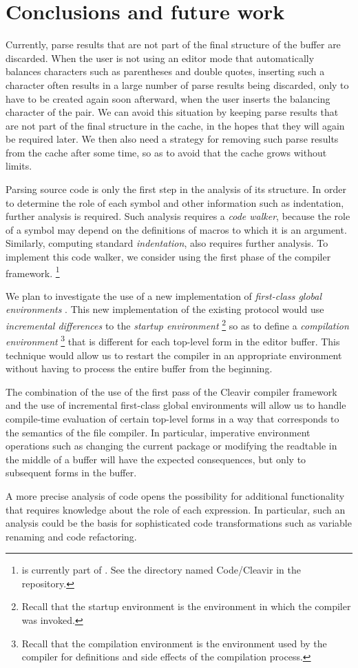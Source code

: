 \section{Conclusions and future work}

Currently, parse results that are not part of the final structure of
the buffer are discarded.  When the user is not using an editor mode
that automatically balances characters such as parentheses and double
quotes, inserting such a character often results in a large number of
parse results being discarded, only to have to be created again soon
afterward, when the user inserts the balancing character of the pair.
We can avoid this situation by keeping parse results that are not part
of the final structure in the cache, in the hopes that they will again
be required later.  We then also need a strategy for removing such
parse results from the cache after some time, so as to avoid that the
cache grows without limits.

Parsing \commonlisp{} source code is only the first step in the
analysis of its structure.  In order to determine the role of each
symbol and other information such as indentation, further analysis is
required.  Such analysis requires a \emph{code walker}, because the
role of a symbol may depend on the definitions of macros to which it
is an argument.  Similarly, computing standard
\emph{indentation}, also requires further analysis.  To implement this
code walker, we consider using the first phase of the \cleavir{}
compiler framework.%
\footnote{\cleavir{} is currently part of \sicl{}.  See the directory
  named Code/Cleavir in the \sicl{} repository.}

We plan to investigate the use of a new implementation of
\emph{first-class global environments}
\cite{Strandh:2015:ELS:Environments}.  This new implementation of the
existing \clos{} protocol would use \emph{incremental differences} to
the \emph{startup environment}%
\footnote{Recall that the startup environment is the environment in
  which the compiler was invoked.}
so as to define a \emph{compilation environment}%
\footnote{Recall that the compilation environment is the environment
  used by the compiler for definitions and side effects of the
  compilation process.}
that is different for each top-level form in the editor buffer.  This
technique would allow us to restart the compiler in an appropriate
environment without having to process the entire buffer from the
beginning.

The combination of the use of the first pass of the Cleavir compiler
framework and the use of incremental first-class global environments
will allow us to handle compile-time evaluation of certain top-level
forms in a way that corresponds to the semantics of the file compiler.
In particular, imperative environment operations such as changing the
current package or modifying the readtable in the middle of a buffer
will have the expected consequences, but only to subsequent forms in
the buffer.

A more precise analysis of \commonlisp{} code opens the
possibility for additional functionality that requires knowledge about
the role of each expression.  In particular, such an analysis could be
the basis for sophisticated code transformations such as variable
renaming and code refactoring.
